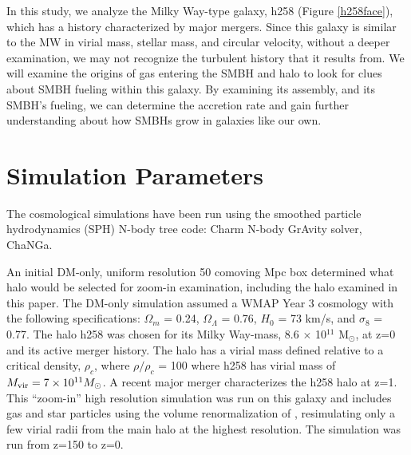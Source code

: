 \documentclass[manuscript]{aastex}
\begin{document}
In this study, we analyze the Milky Way-type galaxy, h258 (Figure \ref{h258face}), which has a history characterized by major mergers. Since this galaxy is similar to the MW in virial mass, stellar mass, and circular velocity, without a deeper examination, we may not recognize the turbulent history that it results from. We will examine the origins of gas entering the SMBH and halo to look for clues about SMBH fueling within this galaxy. By examining its assembly, and its SMBH's fueling, we can determine the accretion rate and gain further understanding about how SMBHs grow in galaxies like our own.




\section{Simulation Parameters}\label{sec-model}


The cosmological simulations have been run using the smoothed particle hydrodynamics (SPH) N-body tree code: Charm N-body GrAvity solver, ChaNGa. 

An initial DM-only, uniform resolution 50 comoving Mpc box determined what halo would be selected for zoom-in examination, including the halo examined in this paper. The DM-only simulation assumed a WMAP Year 3 cosmology \citep{Spergel2007} with the following specifications: $\Omega _m$ = 0.24, $\Omega _{\Lambda}$ = 0.76, $H_0$ = 73 km/s, and $\sigma _8$ = 0.77. The halo h258 was chosen for its Milky Way-mass, 8.6 $\times$ 10$^{11}$  M$_{\odot}$, at z=0 and its active merger history. The halo has a virial mass defined relative to a critical density, $\rho _c$, where $\rho / \rho _c$ = 100 where h258 has virial mass of $M_{\rm vir} = 7 \times 10^{11} M_{\odot}$. A recent major merger characterizes the h258 halo at z=1. This ``zoom-in'' high resolution simulation was run on this galaxy and includes gas and star particles using the volume renormalization of \cite{Katz1993}, resimulating only a few virial radii from the main halo at the highest resolution. The simulation was run from z=150 to z=0.  
\end{document}
